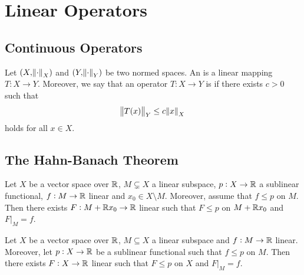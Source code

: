 \section{Linear Operators}
\subsection{Continuous Operators}
\begin{definition}
	Let $(X,\norm{\cdot}_X)$ and $(Y,\norm{\cdot}_Y)$ be two normed spaces. An  is a linear mapping $T : X \to Y$. Moreover, we say that an operator $T : X \to Y$ is  if there exists $c > 0$ such that 
	\begin{equation}
		\norm{T(x)}_Y \leq c\norm{x}_X
	\end{equation}
	\noindent holds for all $x \in X$.
\end{definition}

\subsection{The Hahn-Banach Theorem}

\begin{lemma}
	Let $X$ be a vector space over $\mathbb{R}$, $M \subsetneq X$ a linear subspace, $p : X \to \mathbb{R}$ a sublinear functional, $f : M \to \mathbb{R}$ linear and $x_0 \in X \setminus M$. Moreover, assume that $f \leq p$ on $M$. Then there exists $F : M + \mathbb{R} x_0 \to \mathbb{R}$ linear such that $F \leq p$ on $M + \mathbb{R} x_0$ and $F\vert_M = f$.
\end{lemma}

\begin{theorem}
	Let $X$ be a vector space over $\mathbb{R}$, $M \subseteq X$ a linear subspace and $f : M \to \mathbb{R}$ linear. Moreover, let $p : X \to \mathbb{R}$ be a sublinear functional such that $f \leq p$ on $M$. Then there exists $F : X \to \mathbb{R}$ linear such that $F \leq p$ on $X$ and $F\vert_M = f$.	
\end{theorem}

\begin{theorem}
	
\end{theorem}
